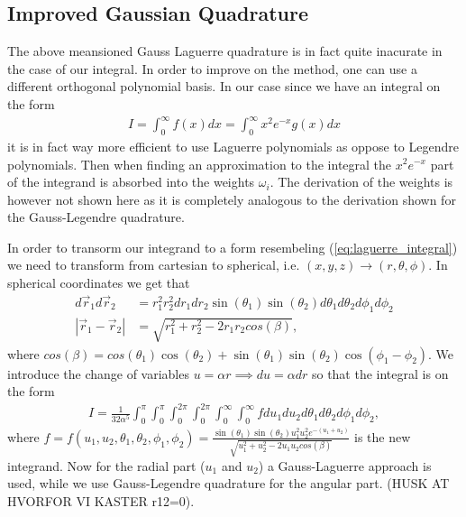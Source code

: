 \documentclass[twocolumn]{aastex62}
\begin{document}
\subsection{Improved Gaussian Quadrature}
The above meansioned Gauss Laguerre quadrature is in fact quite inacurate in the case of our integral. In order to improve on the method, one can use a different orthogonal polynomial basis. In our case since we have an integral on the form
\begin{align}
	I = \int^\infty_0 f(x)dx = \int^\infty_0x^2e^{-x}g(x) dx
	\label{eq:laguerre_integral}
\end{align}
it is in fact way more efficient to use Laguerre polynomials as oppose to Legendre polynomials. Then when finding an approximation to the integral the $x^2e^{-x}$ part of the integrand is absorbed into the weights $\omega_i$. The derivation of the weights is however not shown here as it is completely analogous to the derivation shown for the Gauss-Legendre quadrature.

In order to transorm our integrand to a form resembeling (\ref{eq:laguerre_integral}) we need to transform from cartesian to spherical, i.e. $(x, y, z)\to(r, \theta, \phi)$. In spherical coordinates we get that 
\begin{align}
	d\vec{r}_1d\vec{r}_2 &= r_1^2r_2^2 dr_1dr_2\sin(\theta_1)\sin(\theta_2)d\theta_1d\theta_2d\phi_1d\phi_2\\
	|\vec{r}_1 - \vec{r}_2| &= \sqrt{r_1^2 + r_2^2 - 2r_1r_2cos(\beta)},
\end{align}
where $cos(\beta) = cos(\theta_1)\cos(\theta_2) + \sin(\theta_1)\sin(\theta_2)\cos(\phi_1 - \phi_2)$.
We introduce the change of variables $u = \alpha r \implies du = \alpha dr$ so that the integral is on the form
\begin{align}
	I = \frac{1}{32 \alpha^5} \int^\pi_0\int^{\pi}_0\int^{2\pi}_0\int^{2\pi}_0\int^\infty_0\int^\infty_0 fdu_1du_2d\theta_1d\theta_2d\phi_1d\phi_2,
\end{align}
where $f = f(u_1, u_2, \theta_1, \theta_2, \phi_1, \phi_2) = \frac{\sin
	(\theta_1)\sin(\theta_2)u_1^2u_2^2e^{-(u_1+u_2)}}{\sqrt{u_1^2 + u_2^2 - 2u_1u_2cos(\beta)}}$ is the new integrand.
Now for the radial part ($u_1$ and $u_2$) a Gauss-Laguerre approach is used, while we use Gauss-Legendre quadrature for the angular part. 
(HUSK AT HVORFOR VI KASTER r12=0).
\end{document}
